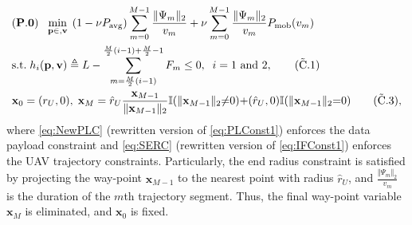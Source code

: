 \documentclass[12pt, draftcls, onecolumn]{IEEEtran}
\theoremstyle{plain}
\theoremstyle{definition}
\theoremstyle{remark}
\begin{document}
\begin{align}
    &(\mathbf{P.0})\;\;\; \underset{\mathbf p \in ,\mathbf v}{\mathrm{min}} \;\,  (1-\nu P_{\mathrm{avg}}) \sum_{m=0}^{M-1} \frac{\Vert \Psi_m \Vert_2}{v_m} + \nu \sum_{m=0}^{M-1} \frac{\Vert \Psi_m \Vert_2}{v_m} P_{\mathrm{mob}}(v_m) \label{eq:HeurMin}\\
    &\mathrm{s.t.}\; h_{i}(\mathbf p ,\mathbf v) \triangleq L - \sum_{m=\frac{M}{2}(i-1)}^{\frac{M}{2}(i-1)+\frac{M}{2}-1} F_{m} \leq 0, \;\; i = 1\text{ and }2,\label{eq:NewPLC}\tag{$\tilde{\text{C}}$.1} \\
    &\mathbf x_0 = (r_U,0), \; \mathbf x_M = 
    \hat{r}_U\frac{\mathbf{x}_{M-1}}{\Vert \mathbf x_{M-1}\Vert_2}\mathbb{I}(\Vert \mathbf x_{M-1} \Vert_2 {\neq} 0) {+} (\hat{r}_U,0)\mathbb{I}(\Vert \mathbf x_{M-1} \Vert_2 {=} 0)\label{eq:SERC}\tag{$\tilde{\text{C}}$.3},
\end{align}
where \ref{eq:NewPLC} (rewritten version of \ref{eq:PLConst1}) enforces the data payload constraint and \ref{eq:SERC} (rewritten version of \ref{eq:IFConst1}) enforces the UAV trajectory constraints. Particularly, the end radius constraint is satisfied by projecting the way-point $\mathbf{x}_{M{-}1}$ to the nearest point with radius $\hat{r}_{U}$, and $\frac{\Vert\Psi_{m}\Vert_{2}}{v_{m}}$ is the duration of the $m$th trajectory segment. Thus, the final way-point variable $\mathbf{x}_{M}$ is eliminated, and $\mathbf{x}_{0}$ is fixed.
\end{document}
